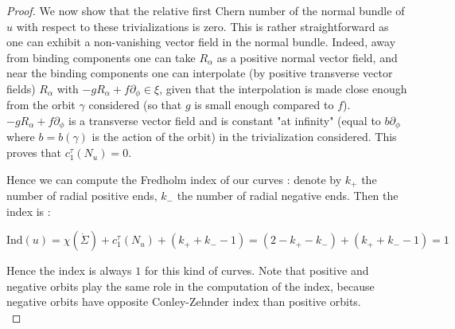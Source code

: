 \documentclass[../main.tex]{subfiles}
\begin{document}
\begin{proof}
We now show that the relative first Chern number of the normal bundle of $u$ with respect to these trivializations is zero. This is rather straightforward as one can exhibit a non-vanishing vector field in the normal bundle. Indeed, away from binding components one can take $R_\alpha$ as a positive normal vector field, and near the binding components one can interpolate (by positive transverse vector fields) $R_\alpha$ with $-gR_\alpha + f\partial_\phi\in \xi$, given that the interpolation is made close enough from the orbit $\gamma $ considered (so that $g$ is small enough compared to $f$). $-gR_\alpha + f\partial_\phi$ is a transverse vector field and is constant "at infinity" (equal to $b\partial_\phi$ where $b = b(\gamma)$ is the action of the orbit) in the trivialization considered. This proves that $c_1^\tau(N_u) = 0$.

Hence we can compute the Fredholm index of our curves : denote by $k_+$ the number of radial positive ends, $k_-$ the number of radial negative ends. Then the index is :

$$\text{Ind}(u) = \chi(\dot \Sigma) + c_1^\tau(N_u) + (k_+ + k_- - 1) = (2-k_+ - k_-) + (k_+ + k_- -1) = 1$$

Hence the index is always $1$ for this kind of curves. Note that positive and negative orbits play the same role in the computation of the index, because negative orbits have opposite Conley-Zehnder index than positive orbits.\\    


\end{proof}
\end{document}
